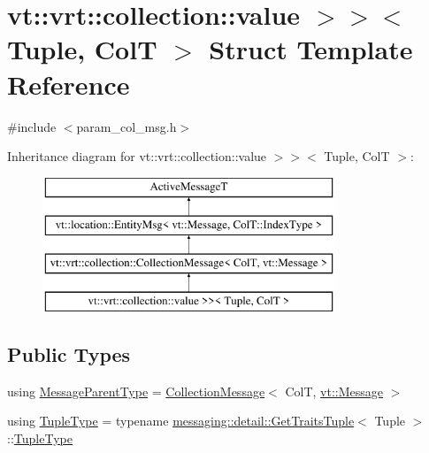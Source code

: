 \hypertarget{structvt_1_1vrt_1_1collection_1_1_param_col_msg_3_01_tuple_00_01_col_t_00_01std_1_1enable__if__te13868956e9675e27cec8f332bda9d5e}{}\section{vt\+:\+:vrt\+:\+:collection\+:\+:value $>$$>$$<$ Tuple, ColT $>$ Struct Template Reference}
\label{structvt_1_1vrt_1_1collection_1_1_param_col_msg_3_01_tuple_00_01_col_t_00_01std_1_1enable__if__te13868956e9675e27cec8f332bda9d5e}


{\ttfamily \#include $<$param\+\_\+col\+\_\+msg.\+h$>$}

Inheritance diagram for vt\+:\+:vrt\+:\+:collection\+:\+:value $>$$>$$<$ Tuple, ColT $>$\+:\begin{figure}[H]
\begin{center}
\leavevmode
\includegraphics[height=4.000000cm]{structvt_1_1vrt_1_1collection_1_1_param_col_msg_3_01_tuple_00_01_col_t_00_01std_1_1enable__if__te13868956e9675e27cec8f332bda9d5e}
\end{center}
\end{figure}
\subsection*{Public Types}
\begin{DoxyCompactItemize}
\item 
using \hyperlink{structvt_1_1vrt_1_1collection_1_1_param_col_msg_3_01_tuple_00_01_col_t_00_01std_1_1enable__if__te13868956e9675e27cec8f332bda9d5e_a31b328a8e2c5e1801564baf8d3e8bf04}{Message\+Parent\+Type} = \hyperlink{structvt_1_1vrt_1_1collection_1_1_collection_message}{Collection\+Message}$<$ ColT, \hyperlink{namespacevt_a3a3ddfef40b4c90915fa43cdd5f129ea}{vt\+::\+Message} $>$
\item 
using \hyperlink{structvt_1_1vrt_1_1collection_1_1_param_col_msg_3_01_tuple_00_01_col_t_00_01std_1_1enable__if__te13868956e9675e27cec8f332bda9d5e_a86867847002b70c52126323faa830dd6}{Tuple\+Type} = typename \hyperlink{structvt_1_1messaging_1_1detail_1_1_get_traits_tuple}{messaging\+::detail\+::\+Get\+Traits\+Tuple}$<$ Tuple $>$\+::\hyperlink{structvt_1_1vrt_1_1collection_1_1_param_col_msg_3_01_tuple_00_01_col_t_00_01std_1_1enable__if__te13868956e9675e27cec8f332bda9d5e_a86867847002b70c52126323faa830dd6}{Tuple\+Type}
\end{DoxyCompactItemize}
